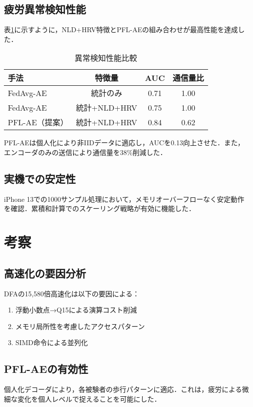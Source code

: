 \documentclass[paper]{ieice}
\begin{document}
\subsection{疲労異常検知性能}

表\ref{tab:anomaly}に示すように，NLD+HRV特徴とPFL-AEの組み合わせが最高性能を達成した．

\begin{table}[t]
\caption{異常検知性能比較}
\label{tab:anomaly}
\centering
\begin{tabular}{lccc}
\toprule
手法 & 特徴量 & AUC & 通信量比 \\
\midrule
FedAvg-AE & 統計のみ & 0.71 & 1.00 \\
FedAvg-AE & 統計+NLD+HRV & 0.75 & 1.00 \\
PFL-AE（提案） & 統計+NLD+HRV & 0.84 & 0.62 \\
\bottomrule
\end{tabular}
\end{table}

PFL-AEは個人化により非IIDデータに適応し，AUCを0.13向上させた．また，エンコーダのみの送信により通信量を38\%削減した．

\subsection{実機での安定性}
iPhone 13での1000サンプル処理において，メモリオーバーフローなく安定動作を確認．累積和計算でのスケーリング戦略が有効に機能した．

\section{考察}

\subsection{高速化の要因分析}
DFAの15,580倍高速化は以下の要因による：
\begin{enumerate}
\item 浮動小数点→Q15による演算コスト削減
\item メモリ局所性を考慮したアクセスパターン
\item SIMD命令による並列化
\end{enumerate}

\subsection{PFL-AEの有効性}
個人化デコーダにより，各被験者の歩行パターンに適応．これは，疲労による微細な変化を個人レベルで捉えることを可能にした．
\end{document}
